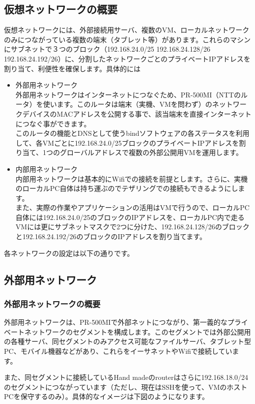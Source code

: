 \documentclass[mingoth,a4paper]{jsarticle}
\begin{document}
\subsection{仮想ネットワークの概要}
仮想ネットワークには、外部接続用サーバ、複数のVM、ローカルネットワークのみにつながっている複数の端末（タブレット等）があります。これらのマシンにサブネットで３つのブロック（192.168.24.0/25 192.168.24.128/26 192.168.24.192/26）に、分割したネットワークごとのプライベートIPアドレスを割り当て、利便性を確保します。具体的には
\begin{itemize}
\item 外部用ネットワーク\\
  外部用ネットワークはインターネットにつなぐため、PR-500MI（NTTのルータ）を使います。このルータは端末（実機、VMを問わず）のネットワークデバイスのMACアドレスを公開する事で、該当端末を直接インターネットにつなぐ事ができます。\\
  このルータの機能とDNSとして使うbindソフトウェアの各ステータスを利用して、各VMごとに192.168.24.0/25ブロックのプライベートIPアドレスを割り当て、1つのグローバルアドレスで複数の外部公開用VMを運用します。
\clearpage
\item 内部用ネットワーク\\
  内部用ネットワークは基本的にWifiでの接続を前提とします。さらに、実機のローカルPC自体は持ち運ぶのでテザリングでの接続もできるようにします。\\
  また、実際の作業やアプリケーションの活用はVMで行うので、ローカルPC自体には192.168.24.0/25のブロックのIPアドレスを、ローカルPC内で走るVMには更にサブネットマスクで2つに分けた、192.168.24.128/26のブロックと192.168.24.192/26のブロックのIPアドレスを割り当てます。
\end{itemize}
各ネットワークの設定は以下の通りです。

\subsection{外部用ネットワーク}
\subsubsection{外部用ネットワークの概要}
外部用ネットワークは、PR-500MIで外部ネットにつながり、第一義的なプライベートネットワークのセグメントを構成します。このセグメントでは外部公開用の各種サーバ、同セグメントのみアクセス可能なファイルサーバ、タブレット型PC、モバイル機器などがあり、これらをイーサネットやWifiで接続しています。

また、同セグメントに接続しているHand madeのrouterはさらに192.168.18.0/24のセグメントにつながっています（ただし、現在はSSHを使って、VMのホストPCを保守するのみ）。具体的なイメージは下図のようになります。
\end{document}
